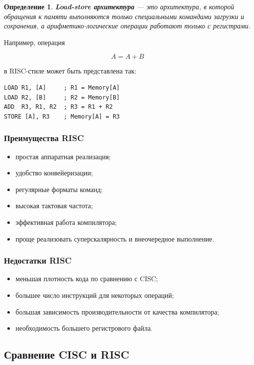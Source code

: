 \documentclass[12pt,a4paper]{article}
\newtheorem{definition}{Определение}
\begin{document}
\begin{definition}
\textbf{Load-store архитектура} --- это архитектура, в которой обращения к памяти выполняются только специальными командами загрузки и сохранения, а арифметико-логические операции работают только с регистрами.
\end{definition}

Например, операция

\[
    A = A + B
\]

в RISC-стиле может быть представлена так:

\begin{lstlisting}
LOAD R1, [A]     ; R1 = Memory[A]
LOAD R2, [B]     ; R2 = Memory[B]
ADD  R3, R1, R2  ; R3 = R1 + R2
STORE [A], R3    ; Memory[A] = R3
\end{lstlisting}

\subsubsection{Преимущества RISC}

\begin{itemize}
    \item простая аппаратная реализация;
    \item удобство конвейеризации;
    \item регулярные форматы команд;
    \item высокая тактовая частота;
    \item эффективная работа компилятора;
    \item проще реализовать суперскалярность и внеочередное выполнение.
\end{itemize}

\subsubsection{Недостатки RISC}

\begin{itemize}
    \item меньшая плотность кода по сравнению с CISC;
    \item большее число инструкций для некоторых операций;
    \item большая зависимость производительности от качества компилятора;
    \item необходимость большего регистрового файла.
\end{itemize}

\subsection{Сравнение CISC и RISC}
\end{document}
